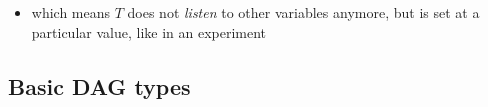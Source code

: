 \documentclass[
  letterpaper,
  DIV=11,
  numbers=noendperiod]{scrartcl}
\providecommand{\tightlist}{%
  \setlength{\itemsep}{0pt}\setlength{\parskip}{0pt}}\usepackage{longtable,booktabs,array}
\begin{document}
\begin{itemize}
\tightlist
\item
  which means \(T\) does not \emph{listen} to other variables anymore,
  but is set at a particular value, like in an experiment
\end{itemize}

\subsection{Basic DAG types}\label{basic-dag-types}

\begin{figure}

\begin{minipage}{0.33\linewidth}



\end{minipage}%
%
\begin{minipage}{0.33\linewidth}

\end{minipage}
\end{figure}
\end{document}

